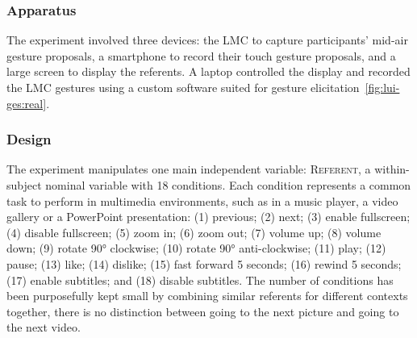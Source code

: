 \subsubsection{Apparatus}
The experiment involved three devices: the LMC to capture participants' mid-air gesture proposals, a smartphone to record their touch gesture proposals, and a large screen to display the referents. %
A laptop controlled the display and recorded the LMC gestures using a custom software suited for gesture elicitation~\ref{fig:lui-ges:real}.


\subsubsection{Design} 
The experiment manipulates one main independent variable:
\textsc{Referent}, a within-subject nominal variable with 18 conditions. Each condition represents a common task to perform in multimedia environments, such as in a music player, a video gallery or a PowerPoint presentation: (1) previous; (2) next; (3) enable fullscreen; (4) disable fullscreen; (5) zoom in; (6) zoom out; (7) volume up; (8) volume down; (9) rotate 90° clockwise; (10) rotate 90° anti-clockwise; (11) play; (12) pause; (13) like; (14) dislike; (15) fast forward 5 seconds; (16) rewind 5 seconds; (17) enable subtitles; and (18) disable subtitles. The number of conditions has been purposefully kept small by combining similar referents for different contexts together, \eg there is no distinction between going to the next picture and going to the next video.

